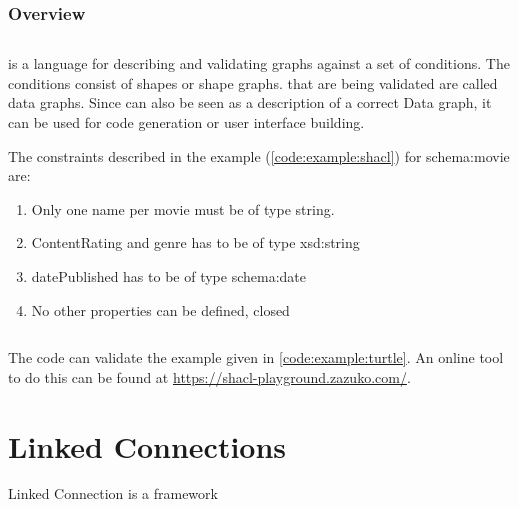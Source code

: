 \begin{landscape}
\subsubsection{Overview}

\end{landscape}


\subsection{}
\cite{noauthor_shapes_2017-1} is a language for describing and validating  graphs against a set of conditions. The conditions consist of shapes or shape graphs.  that are being validated are called data graphs. Since  can also be seen as a description of a correct Data graph, it can be used for code generation or user interface building.

The constraints described in the  example (\autoref{code:example:shacl})  for schema:movie are:
\begin{enumerate}
    \item Only one name per movie must be of type string.
    \item ContentRating and genre has to be of type xsd:string
    \item datePublished has to be of type schema:date
    \item No other properties can be defined, closed
    \end{enumerate}
\begin{listing}[H]
   \inputminted[linenos,frame=single]{turtle}{code/shacl_example.ttl}
    \caption{The  code can validate the  example given in \autoref{code:example:turtle}. An online tool to do this can be found at \url{https://shacl-playground.zazuko.com/}.}
    \label{code:example:shacl}
\end{listing}
\section{Linked Connections}
Linked Connection\cite{noauthor_linked_nodate} is a framework


